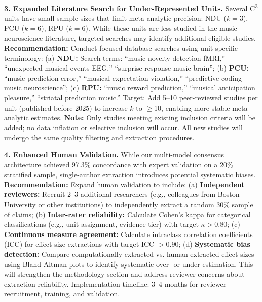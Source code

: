 \documentclass[9pt,onecolumn]{article}
\begin{document}
\textbf{3. Expanded Literature Search for Under-Represented Units.} Several C\textsuperscript{3} units have small sample sizes that limit meta-analytic precision: NDU ($k=3$), PCU ($k=6$), RPU ($k=6$). While these units are less studied in the music neuroscience literature, targeted searches may identify additional eligible studies. \textbf{Recommendation:} Conduct focused database searches using unit-specific terminology: (a) \textbf{NDU:} Search terms: ``music novelty detection fMRI,'' ``unexpected musical events EEG,'' ``surprise response music brain''; (b) \textbf{PCU:} ``music prediction error,'' ``musical expectation violation,'' ``predictive coding music neuroscience''; (c) \textbf{RPU:} ``music reward prediction,'' ``musical anticipation pleasure,'' ``striatal prediction music.'' Target: Add 5--10 peer-reviewed studies per unit (published before 2025) to increase $k$ to $\geq$10, enabling more stable meta-analytic estimates. \textbf{Note:} Only studies meeting existing inclusion criteria will be added; no data inflation or selective inclusion will occur. All new studies will undergo the same quality filtering and extraction procedures.

\textbf{4. Enhanced Human Validation.} While our multi-model consensus architecture achieved 97.3\% concordance with expert validation on a 20\% stratified sample, single-author extraction introduces potential systematic biases. \textbf{Recommendation:} Expand human validation to include: (a) \textbf{Independent reviewers:} Recruit 2--3 additional researchers (e.g., colleagues from Boston University or other institutions) to independently extract a random 30\% sample of claims; (b) \textbf{Inter-rater reliability:} Calculate Cohen's kappa for categorical classifications (e.g., unit assignment, evidence tier) with target $\kappa > 0.80$; (c) \textbf{Continuous measure agreement:} Calculate intraclass correlation coefficients (ICC) for effect size extractions with target ICC $> 0.90$; (d) \textbf{Systematic bias detection:} Compare computationally-extracted vs. human-extracted effect sizes using Bland-Altman plots to identify systematic over- or under-estimation. This will strengthen the methodology section and address reviewer concerns about extraction reliability. Implementation timeline: 3--4 months for reviewer recruitment, training, and validation.
\end{document}
